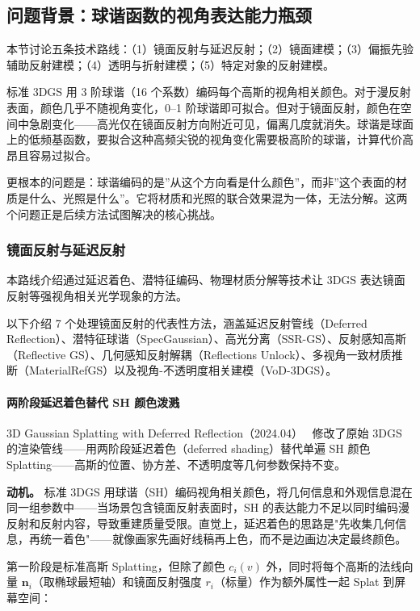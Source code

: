 \subsection{问题背景：球谐函数的视角表达能力瓶颈}

本节讨论五条技术路线：（1）镜面反射与延迟反射；（2）镜面建模；（3）偏振先验辅助反射建模；（4）透明与折射建模；（5）特定对象的反射建模。

标准 3DGS 用 3 阶球谐（16 个系数）编码每个高斯的视角相关颜色。对于漫反射表面，颜色几乎不随视角变化，0--1 阶球谐即可拟合。但对于镜面反射，颜色在空间中急剧变化——高光仅在镜面反射方向附近可见，偏离几度就消失。球谐是球面上的低频基函数，要拟合这种高频尖锐的视角变化需要极高阶的球谐，计算代价高昂且容易过拟合。

更根本的问题是：球谐编码的是”从这个方向看是什么颜色”，而非”这个表面的材质是什么、光照是什么”。它将材质和光照的联合效果混为一体，无法分解。这两个问题正是后续方法试图解决的核心挑战。

\subsubsection{镜面反射与延迟反射}

本路线介绍通过延迟着色、潜特征编码、物理材质分解等技术让 3DGS 表达镜面反射等强视角相关光学现象的方法。

以下介绍 7 个处理镜面反射的代表性方法，涵盖延迟反射管线（Deferred Reflection）、潜特征球谐（SpecGaussian）、高光分离（SSR-GS）、反射感知高斯（Reflective GS）、几何感知反射解耦（Reflections Unlock）、多视角一致材质推断（MaterialRefGS）以及视角-不透明度相关建模（VoD-3DGS）。

\paragraph{两阶段延迟着色替代 SH 颜色泼溅}

3D Gaussian Splatting with Deferred Reflection（2024.04）~\cite{2404_18454} 修改了原始 3DGS 的渲染管线——用两阶段延迟着色（deferred shading）替代单遍 SH 颜色 Splatting——高斯的位置、协方差、不透明度等几何参数保持不变。

\textbf{动机。} 标准 3DGS 用球谐（SH）编码视角相关颜色，将几何信息和外观信息混在同一组参数中——当场景包含镜面反射表面时，SH 的表达能力不足以同时编码漫反射和反射内容，导致重建质量受限。直觉上，延迟着色的思路是"先收集几何信息，再统一着色"——就像画家先画好线稿再上色，而不是边画边决定最终颜色。

第一阶段是标准高斯 Splatting，但除了颜色 $c_i(v)$ 外，同时将每个高斯的法线向量 $\mathbf{n}_i$（取椭球最短轴）和镜面反射强度 $r_i$（标量）作为额外属性一起 Splat 到屏幕空间：

